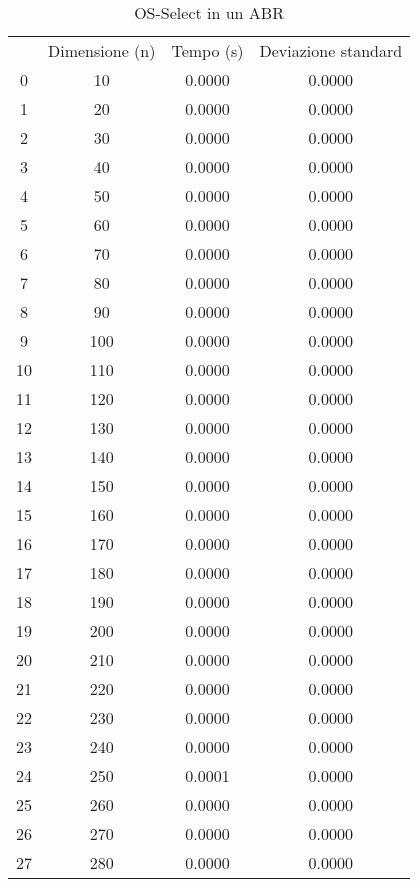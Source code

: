 \begin{table}
\centering
\caption{OS-Select in un ABR}
\label{OS-Select in un ABR}
\begin{adjustbox}{width=1\textwidth/2}
\begin{tabular}{|c|c|c|c|}
\hline
 & Dimensione (n) & Tempo (s) & Deviazione standard \\
0 & 10 & 0.0000 & 0.0000 \\
\cline{1-4}
1 & 20 & 0.0000 & 0.0000 \\
\cline{1-4}
2 & 30 & 0.0000 & 0.0000 \\
\cline{1-4}
3 & 40 & 0.0000 & 0.0000 \\
\cline{1-4}
4 & 50 & 0.0000 & 0.0000 \\
\cline{1-4}
5 & 60 & 0.0000 & 0.0000 \\
\cline{1-4}
6 & 70 & 0.0000 & 0.0000 \\
\cline{1-4}
7 & 80 & 0.0000 & 0.0000 \\
\cline{1-4}
8 & 90 & 0.0000 & 0.0000 \\
\cline{1-4}
9 & 100 & 0.0000 & 0.0000 \\
\cline{1-4}
10 & 110 & 0.0000 & 0.0000 \\
\cline{1-4}
11 & 120 & 0.0000 & 0.0000 \\
\cline{1-4}
12 & 130 & 0.0000 & 0.0000 \\
\cline{1-4}
13 & 140 & 0.0000 & 0.0000 \\
\cline{1-4}
14 & 150 & 0.0000 & 0.0000 \\
\cline{1-4}
15 & 160 & 0.0000 & 0.0000 \\
\cline{1-4}
16 & 170 & 0.0000 & 0.0000 \\
\cline{1-4}
17 & 180 & 0.0000 & 0.0000 \\
\cline{1-4}
18 & 190 & 0.0000 & 0.0000 \\
\cline{1-4}
19 & 200 & 0.0000 & 0.0000 \\
\cline{1-4}
20 & 210 & 0.0000 & 0.0000 \\
\cline{1-4}
21 & 220 & 0.0000 & 0.0000 \\
\cline{1-4}
22 & 230 & 0.0000 & 0.0000 \\
\cline{1-4}
23 & 240 & 0.0000 & 0.0000 \\
\cline{1-4}
24 & 250 & 0.0001 & 0.0000 \\
\cline{1-4}
25 & 260 & 0.0000 & 0.0000 \\
\cline{1-4}
26 & 270 & 0.0000 & 0.0000 \\
\cline{1-4}
27 & 280 & 0.0000 & 0.0000 \\

\end{tabular}
\end{adjustbox}
\end{table}
